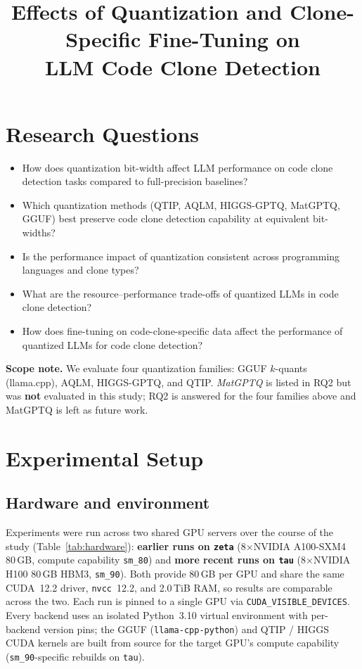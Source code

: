 \documentclass[11pt]{article}
\title{Effects of Quantization and Clone-Specific Fine-Tuning on\\
       LLM Code Clone Detection}
\author{}
\date{}
\begin{document}
\maketitle

\section{Research Questions}
\begin{itemize}
  \item[\textbf{RQ1:}] How does quantization bit-width affect LLM performance on
        code clone detection tasks compared to full-precision baselines?
  \item[\textbf{RQ2:}] Which quantization methods (QTIP, AQLM, HIGGS-GPTQ,
        MatGPTQ, GGUF) best preserve code clone detection capability at
        equivalent bit-widths?
  \item[\textbf{RQ3:}] Is the performance impact of quantization consistent
        across programming languages and clone types?
  \item[\textbf{RQ4:}] What are the resource--performance trade-offs of
        quantized LLMs in code clone detection?
  \item[\textbf{RQ5:}] How does fine-tuning on code-clone-specific data affect
        the performance of quantized LLMs for code clone detection?
\end{itemize}

\noindent\textbf{Scope note.} We evaluate four quantization families: GGUF
$k$-quants (llama.cpp), AQLM, HIGGS-GPTQ, and QTIP. \emph{MatGPTQ} is listed in
RQ2 but was \textbf{not} evaluated in this study; RQ2 is answered for the four
families above and MatGPTQ is left as future work.

\section{Experimental Setup}

\subsection{Hardware and environment}
Experiments were run across two shared GPU servers over the course of the study
(Table~\ref{tab:hardware}): \textbf{earlier runs on \texttt{zeta}}
(8$\times$NVIDIA A100-SXM4 80\,GB, compute capability \texttt{sm\_80}) and
\textbf{more recent runs on \texttt{tau}} (8$\times$NVIDIA H100 80\,GB HBM3,
\texttt{sm\_90}). Both provide 80\,GB per GPU and share the same CUDA~12.2
driver, \texttt{nvcc}~12.2, and 2.0\,TiB RAM, so results are comparable across
the two. Each run is pinned to a single GPU via \texttt{CUDA\_VISIBLE\_DEVICES}.
Every backend uses an isolated Python~3.10 virtual environment with per-backend
version pins; the GGUF (\texttt{llama-cpp-python}) and QTIP / HIGGS CUDA kernels
are built from source for the target GPU's compute capability
(\texttt{sm\_90}-specific rebuilds on \texttt{tau}).
\end{document}
